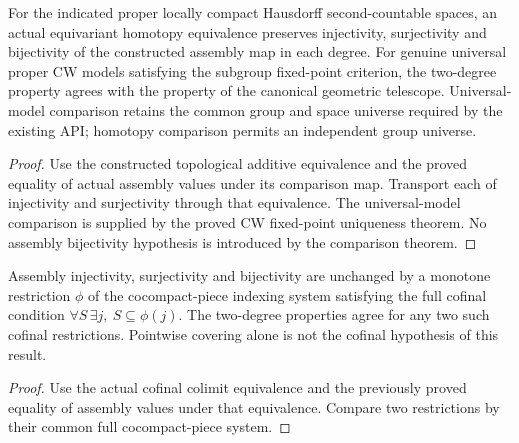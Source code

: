 \begin{proposition}\label{prop:baum-connes-model-invariance}
\leanok
For the indicated proper locally compact Hausdorff second-countable spaces,
an actual equivariant homotopy equivalence preserves injectivity,
surjectivity and bijectivity of the constructed assembly map in each degree.
For genuine universal proper CW models satisfying the subgroup fixed-point
criterion, the two-degree property agrees with the property of the canonical
geometric telescope. Universal-model comparison retains the common group
and space universe required by the existing API; homotopy comparison permits
an independent group universe.
\end{proposition}
\begin{proof}
\leanok
Use the constructed topological additive equivalence and the proved equality
of actual assembly values under its comparison map. Transport each of
injectivity and surjectivity through that equivalence. The universal-model
comparison is supplied by the proved CW fixed-point uniqueness theorem.
No assembly bijectivity hypothesis is introduced by the comparison theorem.
\end{proof}

\begin{proposition}\label{prop:baum-connes-cofinal-invariance}
\leanok
Assembly injectivity, surjectivity and bijectivity are unchanged by a monotone
restriction $\phi$ of the cocompact-piece indexing system satisfying the full
cofinal condition $\forall S\,\exists j,\ S\subseteq\phi(j)$. The two-degree
properties agree for any two such cofinal restrictions. Pointwise covering
alone is not the cofinal hypothesis of this result.
\end{proposition}
\begin{proof}
\leanok
Use the actual cofinal colimit equivalence and the previously proved equality
of assembly values under that equivalence. Compare two restrictions by their
common full cocompact-piece system.
\end{proof}

